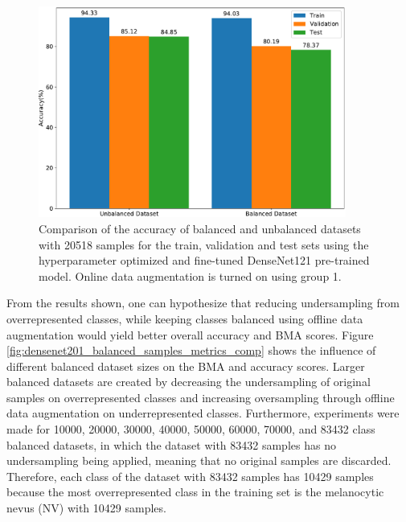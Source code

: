     \begin{figure}[ht]
        \centering
        \includegraphics[width=0.9\textwidth]{figs/densenet201_acc_comp.pdf}
        \caption[Comparison of the accuracy of balanced and unbalanced datasets with 20518 samples for the train, validation and test sets using the hyperparameter optimized and fine-tuned DenseNet121 pre-trained model.]{Comparison of the accuracy of balanced and unbalanced datasets with 20518 samples for the train, validation and test sets using the hyperparameter optimized and fine-tuned DenseNet121 pre-trained model. Online data augmentation is turned on using group 1.}
        \label{fig:densenet201_acc_comp}
    \end{figure}
    
    From the results shown, one can hypothesize that reducing undersampling from overrepresented classes, while keeping classes balanced using offline data augmentation would yield better overall accuracy and \ac{BMA} scores. Figure \ref{fig:densenet201_balanced_samples_metrics_comp} shows the influence of different balanced dataset sizes on the \ac{BMA} and accuracy scores. Larger balanced datasets are created by decreasing the undersampling of original samples on overrepresented classes and increasing oversampling through offline data augmentation on underrepresented classes. Furthermore, experiments were made for 10000, 20000, 30000, 40000, 50000, 60000, 70000, and 83432 class balanced datasets, in which the dataset with 83432 samples has no undersampling being applied, meaning that no original samples are discarded. Therefore, each class of the dataset with 83432 samples has 10429 samples because the most overrepresented class in the training set is the melanocytic nevus (NV) with 10429 samples. \par
    
